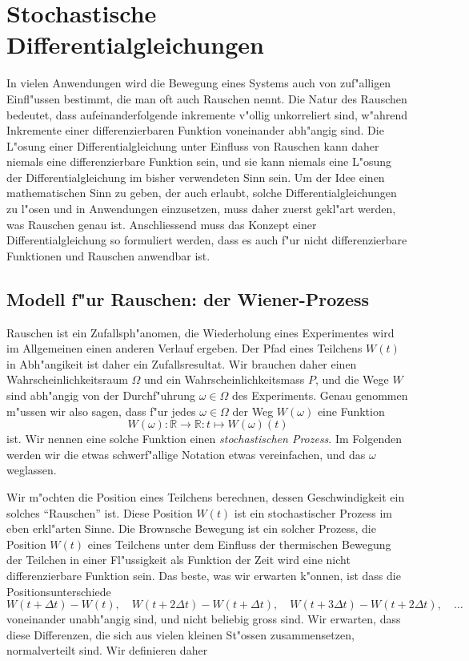 %
%
\chapter{Stochastische Differentialgleichungen\label{chapter:stochastisch}}
\rhead{}
In vielen Anwendungen wird die Bewegung eines Systems auch von
zuf"alligen Einfl"ussen bestimmt, die man oft auch Rauschen nennt.
Die Natur des Rauschen bedeutet, dass aufeinanderfolgende inkremente
v"ollig unkorreliert sind, w"ahrend Inkremente einer differenzierbaren
Funktion voneinander abh"angig sind.
Die L"osung einer Differentialgleichung unter Einfluss von Rauschen 
kann daher niemals eine differenzierbare Funktion sein, und sie kann
niemals eine L"osung der Differentialgleichung im bisher verwendeten
Sinn sein.
Um der Idee einen mathematischen Sinn zu geben, der auch erlaubt,
solche Differentialgleichungen zu l"osen und in Anwendungen
einzusetzen, muss daher zuerst gekl"art werden, was Rauschen genau ist.
Anschliessend muss das Konzept einer Differentialgleichung so formuliert
werden, dass es auch f"ur nicht differenzierbare Funktionen und Rauschen
anwendbar ist.

%
%
\section{Modell f"ur Rauschen: der Wiener-Prozess\label{section:wiener}}
Rauschen ist ein Zufallsph"anomen, die Wiederholung eines Experimentes
wird im Allgemeinen einen anderen Verlauf ergeben.
Der Pfad eines Teilchens $W(t)$ in Abh"angikeit ist daher ein Zufallsresultat.
Wir brauchen daher einen Wahrscheinlichkeitsraum $\Omega$ und ein
Wahrscheinlichkeitsmass $P$, und die Wege $W$ sind abh"angig von 
der Durchf"uhrung $\omega\in\Omega$ des Experiments. 
Genau genommen m"ussen wir also sagen, dass f"ur jedes $\omega\in\Omega$
der Weg $W(\omega)$ eine Funktion
\[
W(\omega)\colon\mathbb R \to\mathbb R:t\mapsto W(\omega)(t)
\]
ist.
Wir nennen eine solche Funktion einen {\em stochastischen Prozess}.
Im Folgenden werden wir die etwas schwerf"allige Notation etwas
vereinfachen, und das $\omega$ weglassen.

Wir m"ochten die Position eines Teilchens berechnen, dessen Geschwindigkeit
ein solches ``Rauschen'' ist.
Diese Position $W(t)$ ist ein stochastischer Prozess im eben erkl"arten Sinne.
Die Brownsche Bewegung ist ein solcher Prozess, die Position $W(t)$ eines
Teilchens unter dem Einfluss der thermischen Bewegung der Teilchen
in einer Fl"ussigkeit als Funktion der Zeit wird eine nicht
differenzierbare Funktion sein.
Das beste, was wir erwarten k"onnen, ist dass die Positionsunterschiede
\[
W(t+\Delta t)-W(t),
\quad
W(t + 2\Delta t)-W(t+\Delta t),
\quad
W(t + 3\Delta t)-W(t+2\Delta t),\quad\dots
\]
voneinander unabh"angig sind, und nicht beliebig gross sind.
Wir erwarten, dass diese Differenzen, die sich aus vielen kleinen
St"ossen zusammensetzen, normalverteilt sind.
Wir definieren daher

